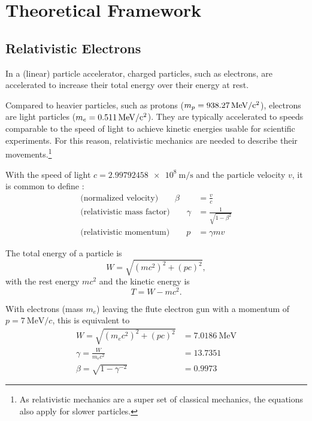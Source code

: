 \chapter{Theoretical Framework}
\section{Relativistic Electrons}
In a (linear) particle accelerator, charged particles, such as electrons, are accelerated to increase their total energy over their energy at rest.

Compared to heavier particles, such as protons ($m_p=\SI{938.27}{\mega\eV\per c\squared}$), electrons are light particles ($m_e=\SI{0.511}{\mega\eV\per c\squared}$). They are typically accelerated to speeds comparable to the speed of light to achieve kinetic energies usable for scientific experiments. For this reason, relativistic mechanics are needed to describe their movements.\footnote{As relativistic mechanics are a super set of classical mechanics, the equations also apply for slower particles.} \cite{Hinterberger1997}

With the speed of light $c=\SI{2.99792458e8}{\m\per\s}$ and the particle velocity $v$, it is common to define \cite{Wangler2008}:
\begin{align}\label{eq:theoreticalFramework_gammabeta}
\text{(normalized velocity)}\qquad\beta &= \frac{v}{c}\\
\text{(relativistic mass factor)}\qquad\gamma &= \frac{1}{\sqrt{1-\beta^2}} \\
\text{(relativistic momentum)}\qquad p &= \gamma m v 
\end{align}

The total energy of a particle is \cite{Hinterberger1997}
\begin{equation}
W=\sqrt{(mc^2)^2+(pc)^2},
\end{equation}
with the rest energy $mc^2$ and the kinetic energy is
\begin{equation}
T=W-mc^2.
\end{equation}

With electrons (mass $m_e$) leaving the \gls{flute} electron gun with a momentum of $p=\SI{7}{\MeV\per c}$, this is equivalent to
\begin{align}
W=\sqrt{(m_ec^2)^2+(pc)^2} &= \SI{7.0186}{\MeV}\\
\gamma = \frac{W}{m_ec^2} &= \num{13.7351}\\
\beta = \sqrt{1-\gamma^{-2}} &= 0.9973
\end{align}

